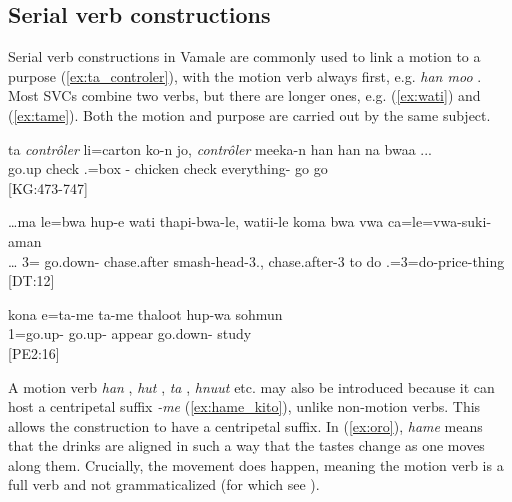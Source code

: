 \subsection{Serial verb constructions}
\label{sec:SVC}

Serial verb constructions in Vamale are commonly used to link a motion to a purpose (\ref{ex:ta_controler}), with the motion verb always first, e.g. \textit{han moo}  . Most SVCs combine two verbs, but there are longer ones, e.g. (\ref{ex:wati}) and (\ref{ex:tame}). Both the motion and purpose are carried out by the same subject.
 
\ea \label{ex:ta_controler}
\gll ta \textit{contrôler} li=carton ko-n jo, \textit{contrôler} meeka-n han han na bwaa ...\\ 
 go.up check .=box - chicken check everything- go go   \\ 
\glt {} {[KG:473-747]}
\z


\ea\label{ex:wati}
\gll \ldots ma le=bwa hup-e wati thapi-bwa-le, watii-le koma bwa vwa ca=le=vwa-suki-aman\\ 
 \ldots {} 3= go.down- chase.after smash-head-3., chase.after-3 to  do .=3=do-price-thing\\ 
\glt {} {[DT:12]}
\z


\ea\label{ex:tame}
\gll kona e=ta-me ta-me thaloot hup-wa sohmun\\ 
  1=go.up- go.up- appear go.down- study\\ 
\glt {} {[PE2:16]}
\z

A motion verb \textit{han} , \textit{hut} , \textit{ta} , \textit{hnuut}  etc. may also be introduced because it can host a centripetal suffix \textit{-me} (\ref{ex:hame_kito}), unlike non-motion verbs. This allows the construction to have a centripetal suffix. In (\ref{ex:oro}), \textit{hame}  means that the drinks are aligned in such a way that the tastes change as one moves along them. Crucially, the movement does happen, meaning the motion verb is a full verb and not grammaticalized (for which see ). 

